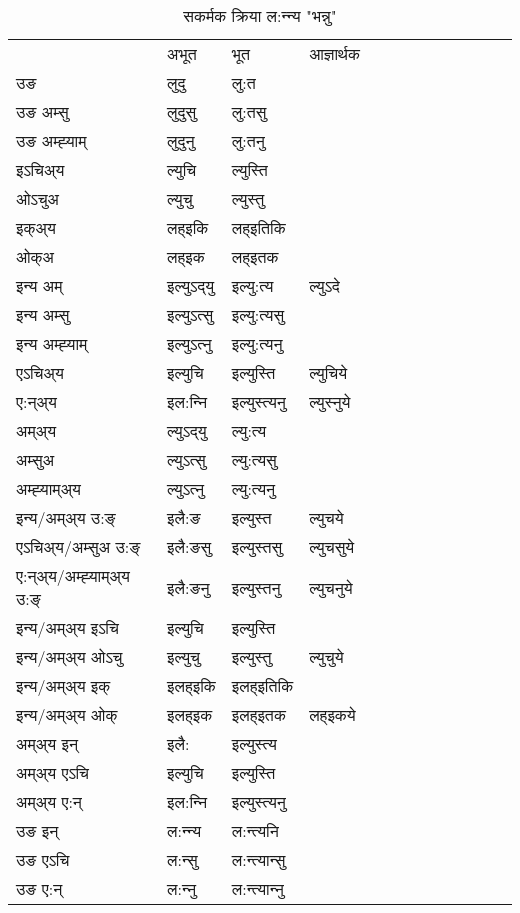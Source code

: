 \begin{table}[H]
\label{ut.vt} \centering
\caption{सकर्मक क्रिया  ल:न्‍न्य  "भन्नु"  }
\begin{tabular}{l|l|l|l|l|l|l|l|l|l|l|l|l}  \toprule
&अभूत & भूत & आज्ञार्थक \\ 
उङ &लुदु &लु:त \\ 
उङ अम्सु &लुदुसु &लु:तसु \\ 
उङ अम्ह्‍याम् &लुदुनु &लु:तनु \\ 
इऽचिअ्य &ल्युचि &ल्युस्ति   \\ 
ओऽचुअ &ल्युचु &ल्युस्तु   \\ 
इक्अ्य &लह्इकि &लह्इतिकि   \\ 
ओक्अ &लह्इक &लह्इतक   \\ 
इन्य अम् & इल्युऽद्‌यु  & इल्यु:त्य &ल्युऽदे  \\ 
इन्य अम्सु & इल्युऽत्सु  & इल्यु:त्यसु   \\ 
इन्य अम्ह्‍याम् & इल्युऽत्‍नु  & इल्यु:त्यनु   \\ 
एऽचिअ्य & इल्युचि & इल्युस्ति &ल्युचिये    \\ 
ए:न्अ्य & इल:न्‍नि  & इल्युस्त्यनु &ल्युस्‍नुये  \\ 
अम्अ्य & ल्युऽद्‌यु  & ल्यु:त्य  \\ 
अम्सुअ & ल्युऽत्सु & ल्यु:त्यसु  \\ 
अम्ह्‍याम्अ्य & ल्युऽत्‍नु  & ल्यु:त्यनु \\ 
\midrule
इन्य/अम्अ्य उ:ङ्‌&इलै:ङ & इल्युस्त &ल्युचये \\ 
एऽचिअ्य/अम्सुअ उ:ङ्‌ &इलै:ङसु & इल्युस्तसु &ल्युचसुये \\ 
ए:न्अ्य/अम्ह्‍याम्अ्य उ:ङ्‌ &इलै:ङनु & इल्युस्तनु &ल्युचनुये \\ 
इन्य/अम्अ्य इऽचि & इल्युचि & इल्युस्ति    \\ 
इन्य/अम्अ्य ओऽचु & इल्युचु & इल्युस्तु  &ल्युचुये  \\ 
इन्य/अम्अ्य इक् & इलह्इकि & इलह्इतिकि   \\ 
इन्य/अम्अ्य ओक् & इलह्इक & इलह्इतक  &लह्इकये  \\ 
अम्अ्य इन् & इलै: & इल्युस्त्य   \\ 
अम्अ्य एऽचि & इल्युचि & इल्युस्ति    \\ 
अम्अ्य ए:न् & इल:न्‍नि  & इल्युस्त्यनु  \\ 
\midrule
उङ इन् & ल:न्‍न्य  & ल:न्त्यनि  \\ 
उङ एऽचि & ल:न्सु  & ल:न्त्यान्सु   \\ 
उङ ए:न्& ल:न्‍नु  & ल:न्त्यान्‍नु   \\ 
\bottomrule
\end{tabular}
\end{table}



